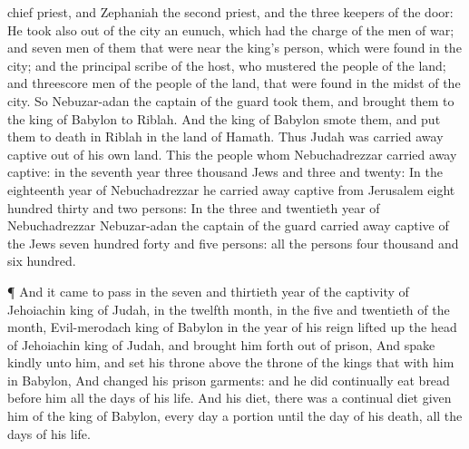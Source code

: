 {chief
priest, and
Zephaniah the
second
priest, and the
three
keepers of the
door:
He
took also out of the
city
an
eunuch, which had the
charge of the
men of
war; and
seven
men of them that were
near the
king’s
person, which were
found in the
city; and the
principal
scribe of the
host, who
mustered the
people of the
land; and
threescore
men of the
people of the
land, that were
found in the
midst of the
city.
So
Nebuzar-adan the
captain of the
guard
took them, and
brought them to the
king of
Babylon to
Riblah.
And the
king of
Babylon
smote them, and put them to
death in
Riblah in the
land of
Hamath. Thus
Judah was carried away
captive out of his own
land.
This
{} the
people whom
Nebuchadrezzar carried away
captive: in the
seventh
year
three
thousand
Jews and
three and
twenty:
In the
eighteenth
year of
Nebuchadrezzar he carried away
captive from
Jerusalem
eight
hundred
thirty and
two
persons:
In the
three and
twentieth
year of
Nebuchadrezzar
Nebuzar-adan the
captain of the
guard carried away
captive of the
Jews
seven
hundred
forty and
five
persons: all the
persons
{}
four
thousand and
six
hundred.
\par }{\PP {}¶ And it came to pass in the
seven and
thirtieth
year of the
captivity of
Jehoiachin
king of
Judah, in the
twelfth
month, in the
five and
twentieth
{} of the
month,
{}
Evil-merodach
king of
Babylon in the
{}
year of his
reign lifted
up the
head of
Jehoiachin
king of
Judah, and brought him
forth out of
prison,
And
spake
kindly unto him, and
set his
throne
above the
throne of the
kings that
{} with him in
Babylon,
And
changed his
prison
garments: and he did
continually
eat
bread
before him all the
days of his
life.
And
{} his
diet, there was a
continual
diet
given him of the
king of
Babylon,
every
day a
portion until the
day of his
death, all the
days of his
life.
\par }